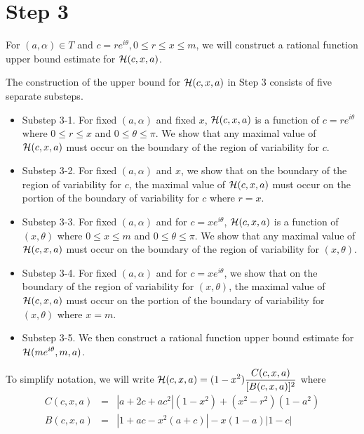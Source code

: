 \documentclass[12pt]{article}
\newcommand{\ds}{\displaystyle}
\begin{document}
\section{Step 3}

For $(a,\alpha) \in T$ and $c = re^{i\theta}, 0 \le r \le x \le m$, we will construct a rational function upper bound estimate for ${\ds {\cal H}(c,x,a)}$.  

The construction of the upper bound for ${\ds {\cal H}(c,x,a)}$ in Step 3 consists of five separate substeps.

\begin{itemize}
	\item Substep 3-1.  For fixed $(a,\alpha)$ and fixed $x$, ${\ds {\cal H}(c,x,a)}$ is a function of $c = re^{i\theta}$ where $0 \le r \le x$ and $0 \le \theta \le \pi$.  We show that any maximal value of ${\ds {\cal H}(c,x,a)}$ must occur on the boundary of the region of variability for $c$.
	\item Substep 3-2.  For fixed $(a,\alpha)$ and $x$, we show that on the boundary of the region of variability for $c$, the maximal value of ${\ds {\cal H}(c,x,a)}$ must occur on the portion of the boundary of variability for $c$ where $r = x$.
	\item Substep 3-3.  For fixed $(a,\alpha)$ and for $c = xe^{i\theta}$, ${\ds {\cal H}(c,x,a)}$ is a function of $(x,\theta)$ where $0 \le x \le m$ and $0 \le \theta \le \pi$. We show that any maximal value of ${\ds {\cal H}(c,x,a)}$ must occur on the boundary of the region of variability for $(x,\theta)$.
	\item Substep 3-4.  For fixed $(a,\alpha)$ and for $c = xe^{i\theta}$, we show that on the boundary of the region of variability for $(x,\theta)$, the maximal value of ${\ds {\cal H}(c,x,a)}$ must occur on the portion of the boundary of variability for $(x,\theta)$ where $x = m$.  
	\item Substep 3-5.  We then construct a rational function upper bound estimate for \linebreak ${\ds {\cal H}(me^{i\theta},m,a)}$.
\end{itemize}
 
To simplify notation, we will write ${\ds {\cal H}(c,x,a) = (1-x^2)\frac{C(c,x,a)}{[B(c,x,a)]^2} }$ where
\begin{eqnarray*}
C(c,x,a) &=& |a+2c+ac^2|(1-x^2) + (x^2-r^2)(1-a^2) \\
B(c,x,a) &=& |1+ac-x^2(a+c)|-x(1-a)|1-c| \\
\end{eqnarray*}
\end{document}
